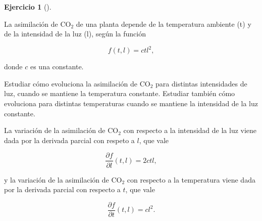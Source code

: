 \documentclass[
  spanish,
  a4paper,
]{scrreport}
\theoremstyle{definition}
\newtheorem{exercise}{Ejercicio}[chapter]
\theoremstyle{remark}
\begin{document}
\begin{exercise}[]\protect\hypertarget{exr-co2-planta}{}\label{exr-co2-planta}

La asimilación de CO\(_2\) de una planta depende de la temperatura
ambiente (t) y de la intensidad de la luz (l), según la función

\[
f(t,l) = ctl^2,
\]

donde \(c\) es una constante.

Estudiar cómo evoluciona la asimilación de CO\(_2\) para distintas
intensidades de luz, cuando se mantiene la temperatura constante.
Estudiar también cómo evoluciona para distintas temperaturas cuando se
mantiene la intensidad de la luz constante.

\end{exercise}

\begin{tcolorbox}[enhanced jigsaw, arc=.35mm, bottomrule=.15mm, bottomtitle=1mm, breakable, colback=white, colbacktitle=quarto-callout-tip-color!10!white, colframe=quarto-callout-tip-color-frame, coltitle=black, left=2mm, leftrule=.75mm, opacityback=0, opacitybacktitle=0.6, rightrule=.15mm, title=\textcolor{quarto-callout-tip-color}{\faLightbulb}\hspace{0.5em}{Solución}, titlerule=0mm, toprule=.15mm, toptitle=1mm]

La variación de la asimilación de CO\(_2\) con respecto a la intensidad
de la luz viene dada por la derivada parcial con respeto a \(l\), que
vale

\[
\frac{\partial f}{\partial l}(t,l) = 2ctl,
\]

y la variación de la asimilación de CO\(_2\) con respecto a la
temperatura viene dada por la derivada parcial con respecto a \(t\), que
vale

\[
\frac{\partial f}{\partial t}(t,l) = cl^2.
\]

\end{tcolorbox}
\end{document}
